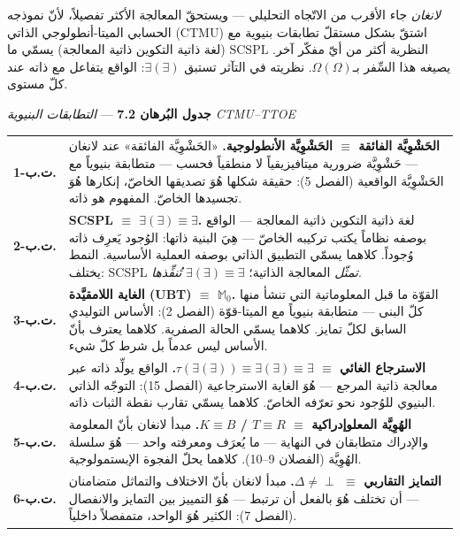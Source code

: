 \documentclass[10pt, openany, oneside]{book}
\renewcommand{\footnotesize}{\fontsize{8.5}{11}\selectfont}
\begin{document}
\textit{لانغان} جاء الأقرب من الاتّجاه التحليلي --- ويستحقّ المعالجة الأكثر تفصيلاً، لأنّ نموذجه الحسابي الميتا-أنطولوجي الذاتي (CTMU) اشتقّ بشكل مستقلّ تطابقات بنيوية مع النظرية أكثر من أيّ مفكّر آخر. $\text{SCSPL}$ (لغة ذاتية التكوين ذاتية المعالجة) يسمّي ما يصيغه هذا السِّفر بـ$\Omega(\Omega)$. نظريته في التآثر تستبق $\exists(\exists)$: الواقع يتفاعل مع ذاته عند كلّ مستوى.

\vspace{0.5em}

\textbf{جدول البُرهان 7.2} --- \textit{التطابقات البنيوية CTMU--TTOE}

\vspace{0.5em}

{\footnotesize
\noindent\begin{tabular}{r p{}}
\textbf{ت.ب-1.} & \textbf{الحَشْوِيَّة الفائقة $\equiv$ الحَشْوِيَّة الأنطولوجية.} «الحَشْوِيَّة الفائقة» عند لانغان --- حَشْوِيَّة ضرورية ميتافيزيقياً لا منطقياً فحسب --- متطابقة بنيوياً مع الحَشْوِيَّة الواقعية (الفصل 5): حقيقة شكلها هُوَ تصديقها الخاصّ، إنكارها هُوَ تجسيدها الخاصّ. المفهوم هو ذاته. \\[0.3em]
\textbf{ت.ب-2.} & \textbf{SCSPL $\equiv$ $\exists(\exists) \equiv \exists$.} لغة ذاتية التكوين ذاتية المعالجة --- الواقع بوصفه نظاماً يكتب تركيبه الخاصّ --- هِيَ البنية ذاتها: الوُجود يَعرِف ذاته وُجوداً. كلاهما يسمّي التطبيق الذاتي بوصفه العملية الأساسية. النمط يختلف: SCSPL \textit{تمثّل} المعالجة الذاتية؛ $\exists(\exists) \equiv \exists$ \textit{تُنفِّذها}. \\[0.3em]
\textbf{ت.ب-3.} & \textbf{الغاية اللامقيَّدة (UBT) $\equiv$ $\mathbb{M}_0$.} القوّة ما قبل المعلوماتية التي تنشأ منها كلّ البنى --- متطابقة بنيوياً مع الميتا-قوّة (الفصل 2): الأساس التوليدي السابق لكلّ تمايز. كلاهما يسمّي الحالة الصفرية. كلاهما يعترف بأنّ الأساس ليس عدماً بل شرط كلّ شيء. \\[0.3em]
\textbf{ت.ب-4.} & \textbf{الاسترجاع الغائي $\equiv$ $\tau(\exists(\exists)) \equiv \exists(\exists) \equiv \exists$.} الواقع يولِّد ذاته عبر معالجة ذاتية المرجع --- هُوَ الغاية الاسترجاعية (الفصل 15): التوجّه الذاتي البنيوي للوُجود نحو تعرّفه الخاصّ. كلاهما يسمّي تقارب نقطة الثبات ذاته. \\[0.3em]
\textbf{ت.ب-5.} & \textbf{الهُوِيَّة المعلوإدراكية $\equiv$ $T \equiv R$ / $K \equiv B$.} مبدأ لانغان بأنّ المعلومة والإدراك متطابقان في النهاية --- ما يُعرَف ومعرفته واحد --- هُوَ سلسلة الهُوِيَّة (الفصلان 9--10). كلاهما يحلّ الفجوة الإبستمولوجية. \\[0.3em]
\textbf{ت.ب-6.} & \textbf{التمايز التقاربي $\equiv$ $\Delta \neq \perp$.} مبدأ لانغان بأنّ الاختلاف والتماثل متضامنان --- أن تختلف هُوَ بالفعل أن ترتبط --- هُوَ التمييز بين التمايز والانفصال (الفصل 7): الكثير هُوَ الواحد، متمفصلاً داخلياً. \\[0.3em]
\end{tabular}
}
\end{document}
